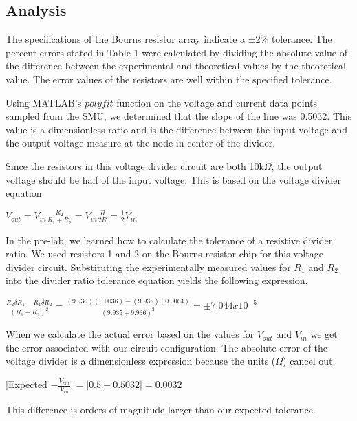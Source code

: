 \documentclass{article}
\begin{document}
\subsection{Analysis}
The specifications of the Bourns resistor array indicate a ±2\% tolerance. The percent errors stated in Table 1 were calculated by dividing the absolute value of the difference between the experimental and theoretical values by the theoretical value. The error values of the resistors are well within the specified tolerance.

Using MATLAB's $polyfit$ function on the voltage and current data points sampled from the SMU, we determined that the slope of the line was 0.5032. This value is a dimensionless ratio and is the difference between the input voltage and the output voltage measure at the node in center of the divider. 
\newline

Since the resistors in this voltage divider circuit are both 10k$\Omega$, the output voltage should be half of the input voltage. This is based on the voltage divider equation

\begin{center}
    $V_{out} = V_{in}\frac{R_2}{R_1 + R_2} = V_{in}\frac{R}{2R} = \frac{1}{2}V_{in}$
\end{center}

In the pre-lab, we learned how to calculate the tolerance of a resistive divider ratio. We used resistors 1 and 2 on the Bourns resistor chip for this voltage divider circuit. Substituting the experimentally measured values for $R_1$ and $R_2$ into the divider ratio tolerance equation yields the following expression.

\begin{center}
    $\frac{R_2 \delta R_1 - R_1 \delta R_2}{(R_1 + R_2)^2} = \frac{(9.936)(0.0036) - (9.935) (0.0064)}{(9.935 + 9.936)^2} = \pm 7.044 x 10^{-5}$ 
\end{center}

When we calculate the actual error based on the values for $V_{out}$ and $V_{in}$ we get the error associated with our circuit configuration. The absolute error of the voltage divider is a dimensionless expression because the units ($\Omega$) cancel out.

\begin{center}
    $|$Expected $- \frac{V_{out}}{V_{in}}| = |0.5 - 0.5032| = 0.0032$
\end{center}
This difference is orders of magnitude larger than our expected tolerance. 
\end{document}
